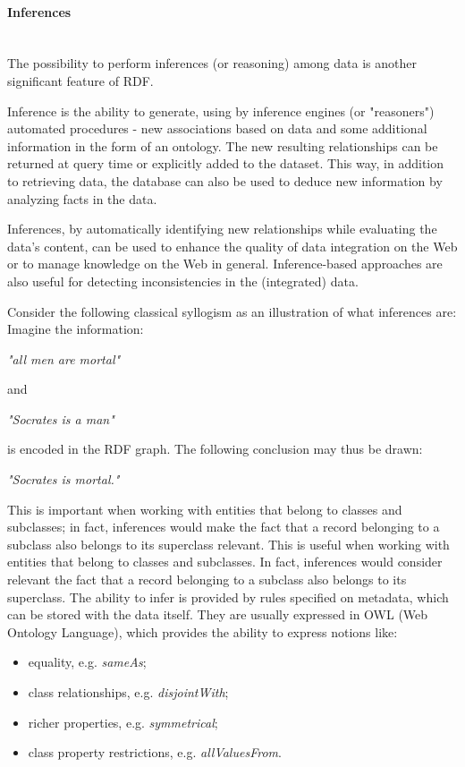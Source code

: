 \paragraph{Inferences}\mbox{}\\\indent
The possibility to perform inferences (or reasoning) among data is another significant feature of RDF.

\begin{definition}[of inferences]\label{definition:ofinferences}
	Inference is the ability to generate, using by inference engines (or "reasoners") automated procedures - new associations based on data and some additional information in the form of an ontology.
	The new resulting relationships can be returned at query time or explicitly added to the dataset.
	This way, in addition to retrieving data, the database can also be used to deduce new information by analyzing facts in the data.
\end{definition}

Inferences, by automatically identifying new relationships while evaluating the data's content, can be used to enhance the quality of data integration on the Web or to manage knowledge on the Web in general.
Inference-based approaches are also useful for detecting inconsistencies in the (integrated) data.

Consider the following classical syllogism as an illustration of what inferences are:
Imagine the information:
\begin{quoting}[begintext={}, endtext={}]
	\centering\textit{"all men are mortal"}
\end{quoting}
and
\begin{quoting}[
	begintext={},
	endtext={}
]
	\centering\textit{"Socrates is a man"}
\end{quoting}
is encoded in the RDF graph.
The following conclusion may thus be drawn:
\begin{quoting}[begintext={}, endtext={}]
	\centering\textit{"Socrates is mortal."}
\end{quoting}
This is important when working with entities that belong to classes and subclasses; in fact, inferences would make the fact that a record belonging to a subclass also belongs to its superclass relevant.
This is useful when working with entities that belong to classes and subclasses.
In fact, inferences would consider relevant the fact that a record belonging to a subclass also belongs to its superclass.
The ability to infer is provided by rules specified on metadata, which can be stored with the data itself.
They are usually expressed in OWL (Web Ontology Language), which provides the ability to express notions like:
 \begin{itemize}[noitemsep]
	\item equality, e.g. \textit{sameAs};
	\item class relationships, e.g. \textit{disjointWith};
	\item richer properties, e.g. \textit{symmetrical};
	\item class property restrictions, e.g. \textit{allValuesFrom}.
\end{itemize}


